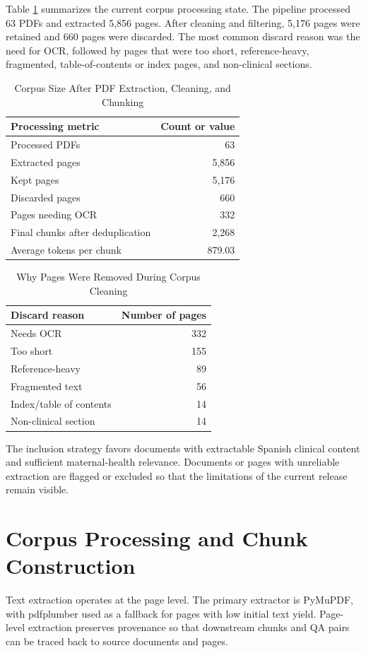 \documentclass[conference]{IEEEtran}
\begin{document}
Table \ref{tab:corpus_stats} summarizes the current corpus processing state. The pipeline processed 63 PDFs and extracted 5,856 pages. After cleaning and filtering, 5,176 pages were retained and 660 pages were discarded. The most common discard reason was the need for OCR, followed by pages that were too short, reference-heavy, fragmented, table-of-contents or index pages, and non-clinical sections.

\begin{table}[t]
\caption{Corpus Size After PDF Extraction, Cleaning, and Chunking}
\label{tab:corpus_stats}
\centering
\begin{tabular}{|l|r|}
\hline
\textbf{Processing metric} & \textbf{Count or value} \\
\hline
Processed PDFs & 63 \\
Extracted pages & 5,856 \\
Kept pages & 5,176 \\
Discarded pages & 660 \\
Pages needing OCR & 332 \\
Final chunks after deduplication & 2,268 \\
Average tokens per chunk & 879.03 \\
\hline
\end{tabular}
\end{table}

\begin{table}[t]
\caption{Why Pages Were Removed During Corpus Cleaning}
\label{tab:discard_reasons}
\centering
\begin{tabular}{|l|r|}
\hline
\textbf{Discard reason} & \textbf{Number of pages} \\
\hline
Needs OCR & 332 \\
Too short & 155 \\
Reference-heavy & 89 \\
Fragmented text & 56 \\
Index/table of contents & 14 \\
Non-clinical section & 14 \\
\hline
\end{tabular}
\end{table}

The inclusion strategy favors documents with extractable Spanish clinical content and sufficient maternal-health relevance. Documents or pages with unreliable extraction are flagged or excluded so that the limitations of the current release remain visible.

\section{Corpus Processing and Chunk Construction}
Text extraction operates at the page level. The primary extractor is PyMuPDF, with pdfplumber used as a fallback for pages with low initial text yield. Page-level extraction preserves provenance so that downstream chunks and QA pairs can be traced back to source documents and pages.
\end{document}
